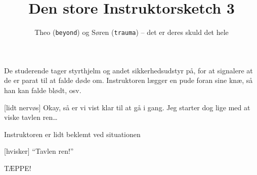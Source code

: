\documentclass[danish]{article}
\title{Den store Instruktorsketch 3}
\author{Theo (\texttt{beyond}) og Søren (\texttt{trauma}) -- det er deres skuld det hele}
\begin{document}
\maketitle

\begin{sketch}

\scene De studerende tager styrthjelm og andet sikkerhedsudstyr på, for at signalere at de er parat til at falde døde om. Instruktoren lægger en pude foran sine knæ, så han kan falde blødt, osv.

[lidt nervøs] Okay, så er vi vist klar til at gå i gang. Jeg starter dog lige med at viske tavlen ren\ldots

\scene Instruktoren er lidt beklemt ved situationen

[hvisker] ``Tavlen ren!''

\scene TÆPPE!

\end{sketch}
\end{document}
